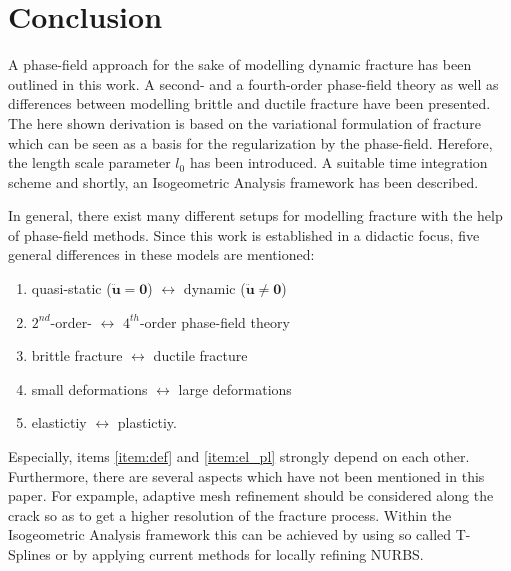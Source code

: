 \section{Conclusion} \label{sec:concl}
A phase-field approach for the sake of modelling dynamic fracture has been outlined in this work. A second- and a fourth-order phase-field theory as well as differences between modelling brittle and ductile fracture have been presented. The here shown derivation is based on the variational formulation of fracture which can be seen as a basis for the regularization by the phase-field. Herefore, the length scale parameter $l_{0}$ has been introduced. A suitable time integration scheme and shortly, an Isogeometric Analysis framework has been described.

In general, there exist many different setups for modelling fracture with the help of phase-field methods. Since this work is established in a didactic focus, five general differences in these models are mentioned:
\begin{enumerate}
	\item quasi-static ($\ddot{\mathbf{u}}=\mathbf{0}$) $\leftrightarrow$  dynamic ($\ddot{\mathbf{u}}\neq\mathbf{0}$)
	\item $2^{nd}$-order- $\leftrightarrow$ $4^{th}$-order phase-field theory
	\item brittle fracture $\leftrightarrow$ ductile fracture
	\item\label{item:def} small deformations $\leftrightarrow$ large deformations
	\item\label{item:el_pl} elastictiy $\leftrightarrow$ plastictiy.
\end{enumerate}
Especially, items \ref{item:def} and \ref{item:el_pl} strongly depend on each other. Furthermore, there are several aspects which have not been mentioned in this paper. For expample, adaptive mesh refinement should be considered along the crack so as to get a higher resolution of the fracture process. Within the Isogeometric Analysis framework this can be achieved by using so called T-Splines or by applying current methods for locally refining NURBS.

